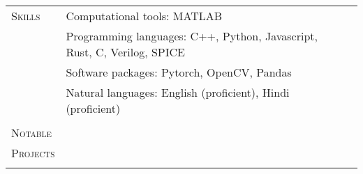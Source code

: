 \documentclass[letterpaper, 10pt, oneside]{article}
\newcommand{\stitle}[1]{\normalsize{\textsc{#1}}}
\begin{document}
\begin{tabular}{@{} l l l}
\stitle{Skills} & Computational tools: MATLAB \\
                & Programming languages: C++, Python, Javascript, Rust, C, Verilog, SPICE \\
                & Software packages: Pytorch, OpenCV, Pandas \\
                & Natural languages: English (proficient), Hindi (proficient) \\
\\

\stitle{Notable}  & \\
\stitle{Projects} & \\
\\




\end{tabular}
\end{document}
